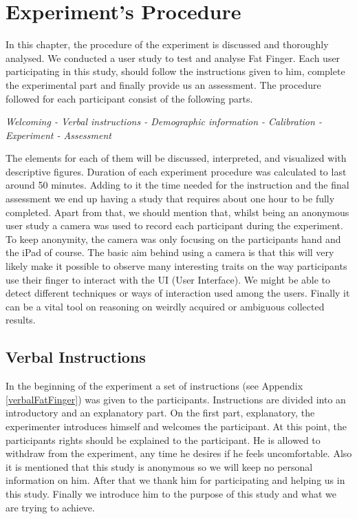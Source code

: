 \section{Experiment's Procedure}


In this chapter, the procedure of the experiment is discussed and thoroughly analysed. We conducted a user study to test and analyse Fat Finger. Each user participating in this study, should follow the instructions given to him, complete the experimental part and finally provide us an assessment. The procedure followed for each participant consist of the following parts. 

\emph{Welcoming - Verbal instructions - Demographic information  - Calibration - Experiment - Assessment}


The elements for each of them will be discussed, interpreted, and visualized with descriptive figures. Duration of each experiment procedure was calculated to last around 50 minutes. Adding to it the time needed for the instruction and the final assessment we end up having a study that requires about one hour to be fully completed. Apart from that, we should mention that, whilst being an anonymous user study a camera was used to record each participant during the experiment. To keep anonymity, the camera was only focusing on the participants hand and the iPad of course. The basic aim behind using a camera is that this will very likely make it possible to observe many interesting traits on the way participants use their finger to interact with the UI (User Interface). We might be able to detect different techniques or ways of interaction used among the users. Finally it can be a vital tool on reasoning on weirdly acquired or ambiguous 
collected results.
\subsection{Verbal Instructions}

In the beginning of the experiment a set of instructions (see Appendix \ref{verbalFatFinger}) was given to the participants. Instructions are divided into an introductory and an explanatory part. On the first part, explanatory, the experimenter introduces himself and welcomes the participant. At this point, the participants rights should be explained to the participant. He is allowed to withdraw from the experiment, any time he desires if he feels uncomfortable. Also it is mentioned that this study is anonymous so we will keep no personal information on him. After that we thank him for participating and helping us in this study. Finally we introduce him to the purpose of this study and what we are trying to achieve.

